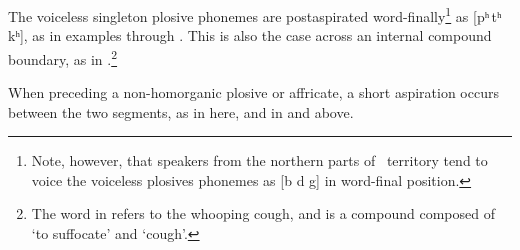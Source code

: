 The voiceless singleton plosive phonemes are postaspirated word-finally\footnote{Note, however, that speakers from the northern parts of \PS\ territory tend to voice the voiceless plosives phonemes as [b d g] in word-final position.} 
as [pʰ\,tʰ\,kʰ], as in examples  through . This is also the case across an internal compound boundary, as in .\footnote{The word  in  refers to the whooping cough, and is a compound composed of  ‘to suffocate’ and  ‘cough’.}

When preceding a non-homorganic plosive or affricate, a short aspiration occurs between the two segments, as in  here, and in  and  above. 

